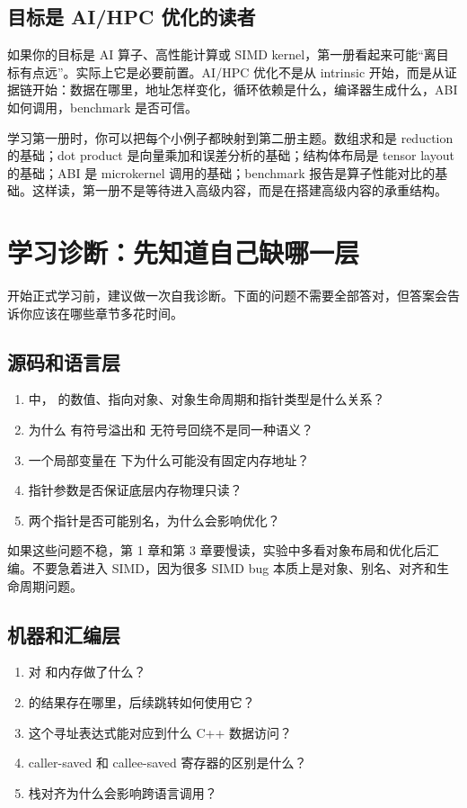 \subsection{目标是 AI/HPC 优化的读者}

如果你的目标是 AI 算子、高性能计算或 SIMD kernel，第一册看起来可能“离目标有点远”。实际上它是必要前置。AI/HPC 优化不是从 intrinsic 开始，而是从证据链开始：数据在哪里，地址怎样变化，循环依赖是什么，编译器生成什么，ABI 如何调用，benchmark 是否可信。

学习第一册时，你可以把每个小例子都映射到第二册主题。数组求和是 reduction 的基础；dot product 是向量乘加和误差分析的基础；结构体布局是 tensor layout 的基础；ABI 是 microkernel 调用的基础；benchmark 报告是算子性能对比的基础。这样读，第一册不是等待进入高级内容，而是在搭建高级内容的承重结构。

\section{学习诊断：先知道自己缺哪一层}

开始正式学习前，建议做一次自我诊断。下面的问题不需要全部答对，但答案会告诉你应该在哪些章节多花时间。

\subsection{源码和语言层}

\begin{enumerate}
  \item {} 中， 的数值、指向对象、对象生命周期和指针类型是什么关系？
  \item 为什么  有符号溢出和  无符号回绕不是同一种语义？
  \item 一个局部变量在  下为什么可能没有固定内存地址？
  \item {} 指针参数是否保证底层内存物理只读？
  \item 两个指针是否可能别名，为什么会影响优化？
\end{enumerate}

如果这些问题不稳，第 1 章和第 3 章要慢读，实验中多看对象布局和优化后汇编。不要急着进入 SIMD，因为很多 SIMD bug 本质上是对象、别名、对齐和生命周期问题。

\subsection{机器和汇编层}

\begin{enumerate}
  \item {} 对  和内存做了什么？
  \item {} 的结果存在哪里，后续跳转如何使用它？
  \item {} 这个寻址表达式能对应到什么 C++ 数据访问？
  \item caller-saved 和 callee-saved 寄存器的区别是什么？
  \item 栈对齐为什么会影响跨语言调用？
\end{enumerate}

